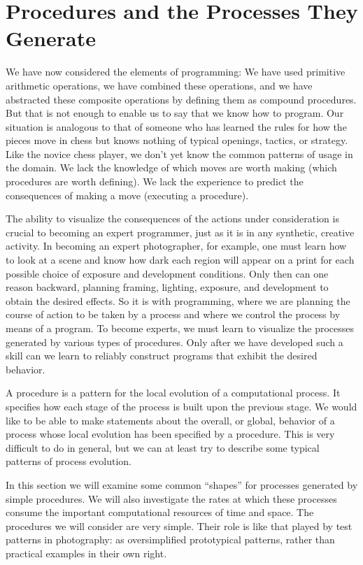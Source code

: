 \section{Procedures and the Processes They Generate}

We have now considered the elements of programming: We have used primitive arithmetic operations, we have combined these operations, and we have abstracted these composite operations by defining them as compound procedures. But that is not enough to enable us to say that we know how to program. Our situation is analogous to that of someone who has learned the rules for how the pieces move in chess but knows nothing of typical openings, tactics, or strategy. Like the novice chess player, we don't yet know the common patterns of usage in the domain. We lack the knowledge of which moves are worth making (which procedures are worth defining). We lack the experience to predict the consequences of making a move (executing a procedure).

The ability to visualize the consequences of the actions under consideration is crucial to becoming an expert programmer, just as it is in any synthetic, creative activity. In becoming an expert photographer, for example, one must learn how to look at a scene and know how dark each region will appear on a print for each possible choice of exposure and development conditions. Only then can one reason backward, planning framing, lighting, exposure, and development to obtain the desired effects. So it is with programming, where we are planning the course of action to be taken by a process and where we control the process by means of a program. To become experts, we must learn to visualize the processes generated by various types of procedures. Only after we have developed such a skill can we learn to reliably construct programs that exhibit the desired behavior.

A procedure is a pattern for the local evolution of a computational process. It specifies how each stage of the process is built upon the previous stage. We would like to be able to make statements about the overall, or global, behavior of a process whose local evolution has been specified by a procedure. This is very difficult to do in general, but we can at least try to describe some typical patterns of process evolution.

In this section we will examine some common ``shapes'' for processes generated by simple procedures. We will also investigate the rates at which these processes consume the important computational resources of time and space. The procedures we will consider are very simple. Their role is like that played by test patterns in photography: as oversimplified prototypical patterns, rather than practical examples in their own right.

